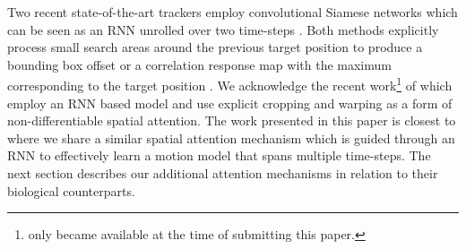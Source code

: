 Two recent state-of-the-art trackers employ convolutional Siamese networks which can be seen as an RNN unrolled over two time-steps \cite{Held2016goturn, Valmadre2017}. Both methods explicitly process small search areas around the previous target position to produce a bounding box offset \cite{Held2016goturn} or a correlation response map with the maximum corresponding to the target position \cite{Valmadre2017}. 
We acknowledge the recent work\footnote{\cite{Gordon2018re3} only became available at the time of submitting this paper.} of \citet{Gordon2018re3} which employ an RNN based model and use explicit cropping and warping as a form of non-differentiable spatial attention.
The work presented in this paper is closest to \cite{Kahou2015ratm} where we share a similar spatial attention mechanism which is guided through an RNN to effectively learn a motion model that spans multiple time-steps. The next section describes our additional attention mechanisms in relation to their biological counterparts.



    
    